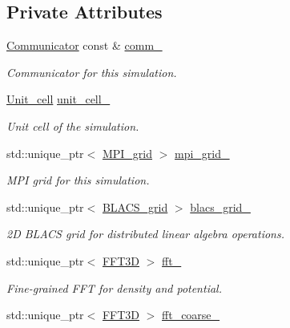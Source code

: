 \subsection*{Private Attributes}
\begin{DoxyCompactItemize}
\item 
\hyperlink{classsddk_1_1_communicator}{Communicator} const \& \hyperlink{classsirius_1_1_simulation__context_aaa69d34673366ac3c0b9ce68755d3876}{comm\+\_\+}
\begin{DoxyCompactList}\small\item\em Communicator for this simulation. \end{DoxyCompactList}\item 
\hyperlink{classsirius_1_1_unit__cell}{Unit\+\_\+cell} \hyperlink{classsirius_1_1_simulation__context_a5d0442d2307a97f467360ad68705decb}{unit\+\_\+cell\+\_\+}
\begin{DoxyCompactList}\small\item\em Unit cell of the simulation. \end{DoxyCompactList}\item 
std\+::unique\+\_\+ptr$<$ \hyperlink{classsddk_1_1_m_p_i__grid}{M\+P\+I\+\_\+grid} $>$ \hyperlink{classsirius_1_1_simulation__context_aa39fe9cd213f9eaa7999bb95346de9b1}{mpi\+\_\+grid\+\_\+}
\begin{DoxyCompactList}\small\item\em M\+P\+I grid for this simulation. \end{DoxyCompactList}\item 
std\+::unique\+\_\+ptr$<$ \hyperlink{classsddk_1_1_b_l_a_c_s__grid}{B\+L\+A\+C\+S\+\_\+grid} $>$ \hyperlink{classsirius_1_1_simulation__context_a9d27b4b363bf0572e54ba140b7ac0855}{blacs\+\_\+grid\+\_\+}
\begin{DoxyCompactList}\small\item\em 2\+D B\+L\+A\+C\+S grid for distributed linear algebra operations. \end{DoxyCompactList}\item 
std\+::unique\+\_\+ptr$<$ \hyperlink{classsddk_1_1_f_f_t3_d}{F\+F\+T3\+D} $>$ \hyperlink{classsirius_1_1_simulation__context_a54c14f3c86f05cc4c125c89b0ee940cf}{fft\+\_\+}
\begin{DoxyCompactList}\small\item\em Fine-\/grained F\+F\+T for density and potential. \end{DoxyCompactList}\item 
std\+::unique\+\_\+ptr$<$ \hyperlink{classsddk_1_1_f_f_t3_d}{F\+F\+T3\+D} $>$ \hyperlink{classsirius_1_1_simulation__context_a4ff2eb943ab88c0e9f3971176c03d626}{fft\+\_\+coarse\+\_\+}

\end{DoxyCompactItemize}
